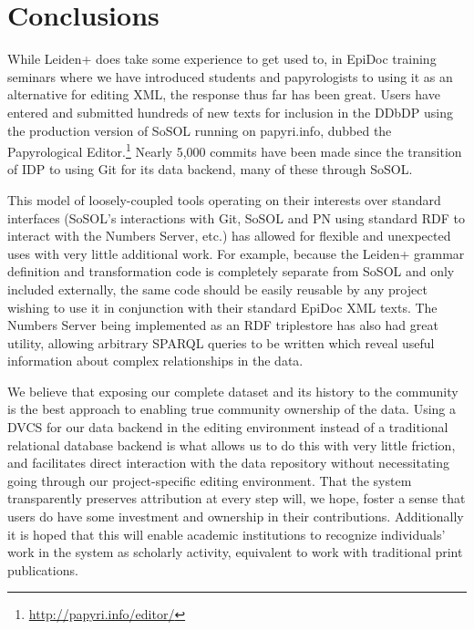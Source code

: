 \documentclass[]{article}
\begin{document}
\section*{Conclusions}

While Leiden+ does take some experience to get used to, in EpiDoc training seminars where we have introduced students and papyrologists to using it as an alternative for editing XML, the response thus far has been great. Users have entered and submitted hundreds of new texts for inclusion in the DDbDP using the production version of SoSOL running on papyri.info, dubbed the Papyrological Editor.\footnote{\url{http://papyri.info/editor/}} Nearly 5,000 commits have been made since the transition of IDP to using Git for its data backend, many of these through SoSOL.

This model of loosely-coupled tools operating on their interests over standard interfaces (SoSOL's interactions with Git, SoSOL and PN using standard RDF to interact with the Numbers Server, etc.) has allowed for flexible and unexpected uses with very little additional work. For example, because the Leiden+ grammar definition and transformation code is completely separate from SoSOL and only included externally, the same code should be easily reusable by any project wishing to use it in conjunction with their standard EpiDoc XML texts. The Numbers Server being implemented as an RDF triplestore has also had great utility, allowing arbitrary SPARQL queries to be written which reveal useful information about complex relationships in the data.

We believe that exposing our complete dataset and its history to the community is the best approach to enabling true community ownership of the data. Using a DVCS for our data backend in the editing environment instead of a traditional relational database backend is what allows us to do this with very little friction, and facilitates direct interaction with the data repository without necessitating going through our project-specific editing environment. That the system transparently preserves attribution at every step will, we hope, foster a sense that users do have some investment and ownership in their contributions. Additionally it is hoped that this will enable academic institutions to recognize individuals' work in the system as scholarly activity, equivalent to work with traditional print publications.
\end{document}
